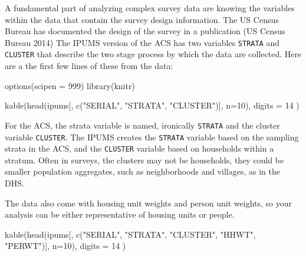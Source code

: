 \documentclass[
  letterpaper,
  DIV=11,
  numbers=noendperiod]{scrreprt}
\newenvironment{Shaded}{\begin{snugshade}}{\end{snugshade}}
\newcommand{\AttributeTok}[1]{\textcolor[rgb]{0.40,0.45,0.13}{#1}}
\newcommand{\DecValTok}[1]{\textcolor[rgb]{0.68,0.00,0.00}{#1}}
\newcommand{\FunctionTok}[1]{\textcolor[rgb]{0.28,0.35,0.67}{#1}}
\newcommand{\NormalTok}[1]{\textcolor[rgb]{0.00,0.23,0.31}{#1}}
\newcommand{\StringTok}[1]{\textcolor[rgb]{0.13,0.47,0.30}{#1}}
\begin{document}
A fundamental part of analyzing complex survey data are knowing the
variables within the data that contain the survey design information.
The US Census Bureau has documented the design of the survey in a
publication (US Census Bureau 2014) The IPUMS version of the ACS has two
variables \texttt{STRATA} and \texttt{CLUSTER} that describe the two
stage process by which the data are collected. Here are a the first few
lines of these from the data:

\begin{Shaded}
\begin{Highlighting}[]
\FunctionTok{options}\NormalTok{(}\AttributeTok{scipen =} \DecValTok{999}\NormalTok{)}
\FunctionTok{library}\NormalTok{(knitr)}
  
\FunctionTok{kable}\NormalTok{(}\FunctionTok{head}\NormalTok{(ipums[, }\FunctionTok{c}\NormalTok{(}\StringTok{"SERIAL"}\NormalTok{, }\StringTok{"STRATA"}\NormalTok{, }\StringTok{"CLUSTER"}\NormalTok{)],}
           \AttributeTok{n=}\DecValTok{10}\NormalTok{),}
      \AttributeTok{digits =} \DecValTok{14}\NormalTok{ )}
\end{Highlighting}
\end{Shaded}

For the ACS, the strata variable is named, ironically \texttt{STRATA}
and the cluster variable \texttt{CLUSTER}. The IPUMS creates the
\texttt{STRATA} variable based on the sampling strata in the ACS, and
the \texttt{CLUSTER} variable based on households within a stratum.
Often in surveys, the clusters may not be households, they could be
smaller population aggregates, such as neighborhoods and villages, as in
the DHS.

The data also come with housing unit weights and person unit weights, so
your analysis can be either representative of housing units or people.

\begin{Shaded}
\begin{Highlighting}[]
\FunctionTok{kable}\NormalTok{(}\FunctionTok{head}\NormalTok{(ipums[, }\FunctionTok{c}\NormalTok{(}\StringTok{"SERIAL"}\NormalTok{, }\StringTok{"STRATA"}\NormalTok{, }\StringTok{"CLUSTER"}\NormalTok{, }\StringTok{"HHWT"}\NormalTok{, }\StringTok{"PERWT"}\NormalTok{)],}
           \AttributeTok{n=}\DecValTok{10}\NormalTok{),}
      \AttributeTok{digits =} \DecValTok{14}\NormalTok{ )}
\end{Highlighting}
\end{Shaded}
\end{document}
